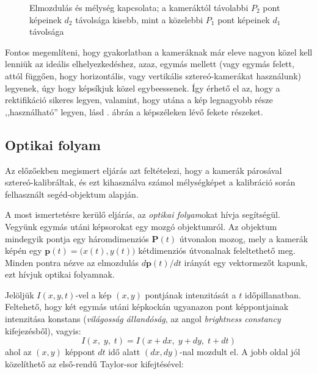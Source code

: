 \begin{figure}[tbh]
  \caption{Elmozdulás és mélység kapcsolata; a kameráktól távolabbi $P_2$ pont képeinek $d_2$ távolsága kisebb, mint a közelebbi $P_1$ pont képeinek $d_1$ távolsága \label{fig:depth-showcase}}
\end{figure}

Fontos megemlíteni, hogy gyakorlatban a kameráknak már eleve nagyon közel kell lenniük az ideális elhelyezkedéshez, azaz, egymás mellett (vagy egymás felett, attól függően, hogy horizontális, vagy vertikális sztereó-kamerákat használunk) legyenek, úgy hogy képsíkjuk közel egybeessenek. Így érhető el az, hogy a rektifikáció sikeres legyen, valamint, hogy utána a kép legnagyobb része ,,használható'' legyen, lásd . ábrán a képszéleken lévő fekete részeket.

\subsection{Optikai folyam \label{methods:optic}}

Az előzőekben megismert eljárás azt feltételezi, hogy a kamerák párosával sztereó-kalib\-ráltak, és ezt kihasználva számol mélységképet a kalibráció során felhasznált segéd-objek\-tum alapján.

A most ismertetésre kerülő eljárás, az \textit{optikai folyam}okat \cite{optic-flow} hívja segítségül. Vegyünk egymás utáni képsorokat egy mozgó objektumról. Az objektum mindegyik pontja egy háromdimenziós $\mathbf{P}(t)$ útvonalon mozog, mely a kamerák képén egy $\mathbf{p}(t) = \big(x(t), y(t)\big)$ kétdimenziós útvonalnak feleltethető meg. Minden pontra nézve az elmozdulás $d\mathbf{p}(t) / dt$ irányát egy vektormezőt kapunk, ezt hívjuk optikai folyamnak.

Jelöljük $I(x, y, t)$-vel a kép $(x, y)$ pontjának intenzitását a $t$ időpillanatban. Feltehető, hogy két egymás utáni képkockán ugyanazon pont képpontjainak intenzitása konstans (\textit{világosság állandóság}, az angol \textit{brightness constancy} kifejezésből), vagyis:
\[I(x,\; y,\; t) = I(x+dx,\; y+dy,\; t+dt)\]
ahol az $(x,y)$ képpont $dt$ idő alatt $(dx,dy)$-nal mozdult el. A jobb oldal jól közelíthető az első-rendű Taylor-sor kifejtésével:

